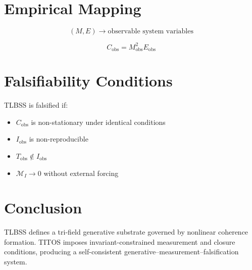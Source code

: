 \documentclass[conference]{IEEEtran}
\begin{document}
\section{Empirical Mapping}

\begin{equation}
(M,E) \rightarrow \text{observable system variables}
\end{equation}

\begin{equation}
C_{\text{obs}} = M_{\text{obs}}^2 E_{\text{obs}}
\end{equation}

\section{Falsifiability Conditions}

TLBSS is falsified if:

\begin{itemize}
\item $C_{\text{obs}}$ is non-stationary under identical conditions
\item $I_{\text{obs}}$ is non-reproducible
\item $T_{\text{obs}} \notin I_{\text{obs}}$
\item $\mathcal{M}_I \rightarrow 0$ without external forcing
\end{itemize}

\section{Conclusion}

TLBSS defines a tri-field generative substrate governed by nonlinear coherence formation. TITOS imposes invariant-constrained measurement and closure conditions, producing a self-consistent generative--measurement--falsification system.
\end{document}
